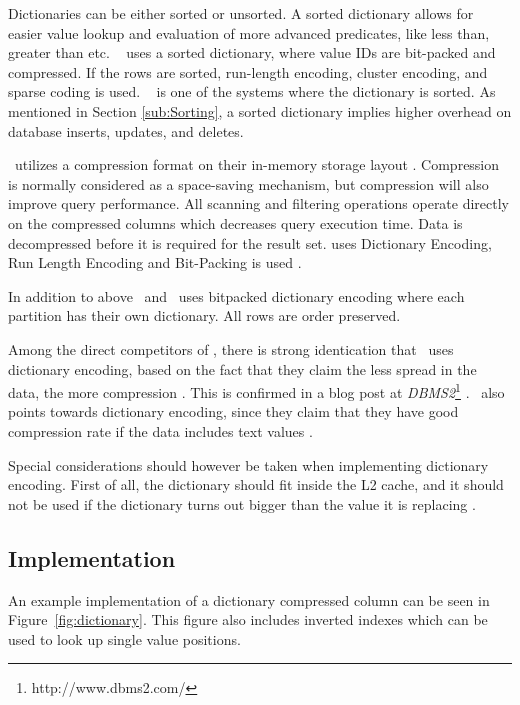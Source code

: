 Dictionaries can be either sorted or unsorted. A sorted dictionary allows for easier value lookup and evaluation of more advanced predicates, like less than, greater than etc. \saph~\cite{Farber2012-vh} uses a sorted dictionary, where value IDs are bit-packed and compressed. If the rows are sorted, run-length encoding, cluster encoding, and sparse coding is used. \sapnw~\cite{Lemke2010-is} is one of the systems where the dictionary is sorted. As mentioned in Section \ref{sub:Sorting}, a sorted dictionary implies higher overhead on database inserts, updates, and deletes.\

\oracle~utilizes a compression format on their in-memory storage layout \cite{Oracle2015-fs}. Compression is normally considered as a space-saving mechanism, but compression will also improve query performance. All scanning and filtering operations operate directly on the compressed columns which decreases query execution time. Data is decompressed before it is required for the result set. \oracle uses Dictionary Encoding, Run Length Encoding and Bit-Packing is used \cite{Oracle2015-fs}. 

In addition to above \ibm~and \blink~uses bitpacked dictionary encoding where each partition has their own dictionary. All rows are order preserved.

Among the direct competitors of \genusSoftware, there is strong identication that \qlikview~uses dictionary encoding, based on the fact that they claim the less spread in the data, the more compression \cite{Qlik2011-ef}. This is confirmed in a blog post at \textit{DBMS2}\footnote{http://www.dbms2.com/} \cite{noauthor_undated-js}. \tableau~also points towards dictionary encoding, since they claim that they have good compression rate if the data includes text values \cite{Kamkolkar2015-iq}.

Special considerations should however be taken when implementing dictionary encoding. First of all, the dictionary should fit inside the L2 cache, and it should not be used if the dictionary turns out bigger than the value it is replacing \cite{Holloway2008-rr}. 

\subsection{Implementation}
\label{sub:Implementation}
An example implementation of a dictionary compressed column can be seen in Figure~\ref{fig:dictionary}. This figure also includes inverted indexes which can be used to look up single value positions.


